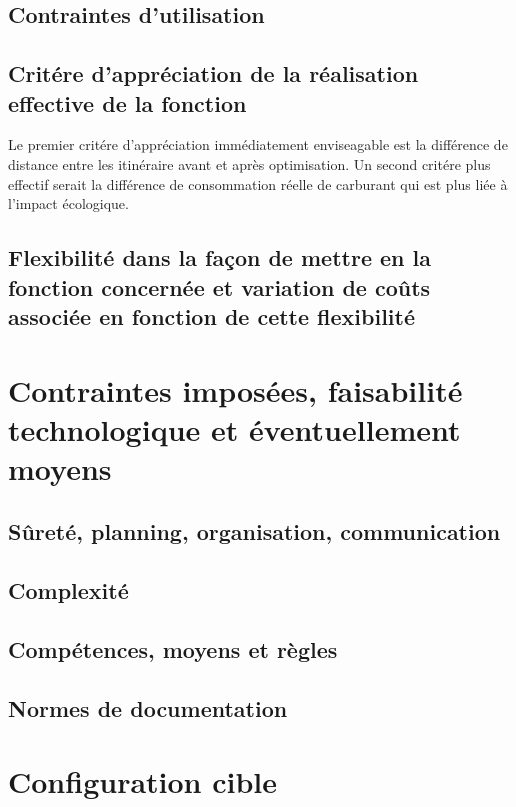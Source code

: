     \subsection{Contraintes d'utilisation}
    
    \subsection{Critére d'appréciation de la réalisation effective de la fonction}
    
        Le premier critére d'appréciation immédiatement enviseagable est la différence de distance entre les itinéraire avant et après optimisation.
        Un second critére plus effectif serait la différence de consommation réelle de carburant qui est plus liée à l'impact écologique.
    
    \subsection{Flexibilité dans la façon de mettre en \oeuvre la fonction concernée et variation de coûts associée en fonction de cette flexibilité}

\section{Contraintes imposées, faisabilité technologique et éventuellement moyens}

    \subsection{Sûreté, planning, organisation, communication}
    
    \subsection{Complexité}
    
    \subsection{Compétences, moyens et règles}
    
    \subsection{Normes de documentation}

\section{Configuration cible}

